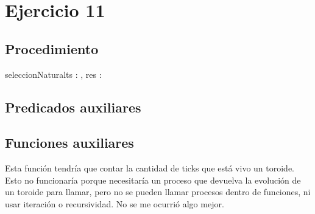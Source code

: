 \documentclass[a4paper]{article}
\begin{document}

\section{Ejercicio 11}

\subsection{Procedimiento}
\begin{proc}{seleccionNatural}{\In ts : , \Out res : \ent}{}
\end{proc}

\subsection{Predicados auxiliares}



\subsection{Funciones auxiliares}
Esta función tendría que contar la cantidad de ticks que está vivo un toroide.
 Esto no funcionaría porque necesitaría un proceso que devuelva la evolución de un toroide
 para llamar, pero no se pueden llamar procesos dentro de funciones, ni usar iteración
 o recursividad. No se me ocurrió algo mejor. \\
 \\
\end{document}

